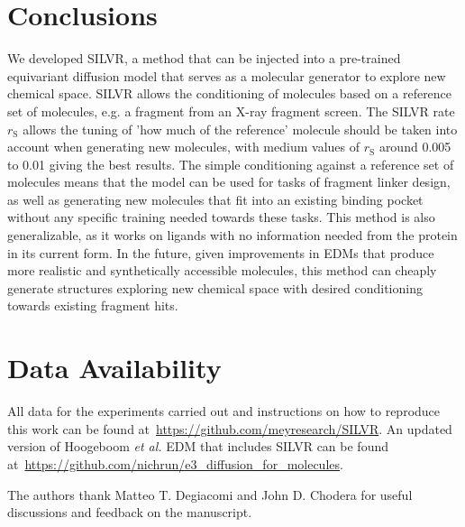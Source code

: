 \documentclass[journal=jacsat,manuscript=article]{achemso}
\begin{document}
\section{Conclusions}
We developed SILVR, a method that can be injected into a pre-trained equivariant diffusion model that serves as a molecular generator to explore new chemical space. SILVR allows the conditioning of molecules based on a reference set of molecules, e.g. a fragment from an X-ray fragment screen. The SILVR rate $r_{\mathrm{S}}$ allows the tuning of 'how much of the reference' molecule should be taken into account when generating new molecules, with medium values of $r_{\mathrm{S}}$ around 0.005 to 0.01 giving the best results. The simple conditioning against a reference set of molecules means that the model can be used for tasks of fragment linker design, as well as generating new molecules that fit into an existing binding pocket without any specific training needed towards these tasks. This method is also generalizable, as it works on ligands with no information needed from the protein in its current form. In the future, given improvements in EDMs that produce more realistic and synthetically accessible molecules, this method can cheaply generate structures exploring new chemical space with desired conditioning towards existing fragment hits.

\section{Data Availability}
All data for the experiments carried out and instructions on how to reproduce this work can be found at~\url{https://github.com/meyresearch/SILVR}. An updated version of Hoogeboom \textit{et al.} EDM that includes SILVR can be found at~\url{https://github.com/nichrun/e3_diffusion_for_molecules}.

\begin{acknowledgement}
The authors thank Matteo T. Degiacomi and John D. Chodera for useful discussions and feedback on the manuscript. 
\end{acknowledgement}



%
%
\printbibliography
\end{document}
